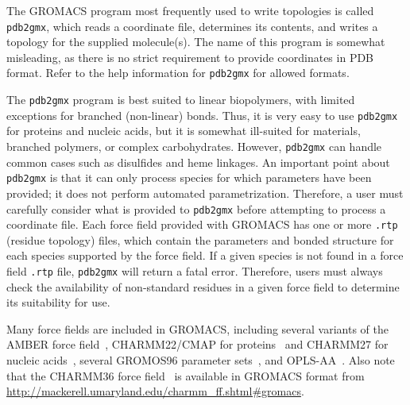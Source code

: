 \documentclass[9pt,tutorial,pubversion]{livecoms}
\begin{document}
The GROMACS program most frequently used to write topologies is called \texttt{pdb2gmx}, which reads a coordinate file, determines its contents, and writes a topology for the supplied molecule(s). The name of this program is somewhat misleading, as there is no strict requirement to provide coordinates in PDB format. Refer to the help information for \texttt{pdb2gmx} for allowed formats.

The \texttt{pdb2gmx} program is best suited to linear biopolymers, with limited exceptions for branched (non-linear) bonds. Thus, it is very easy to use \texttt{pdb2gmx} for proteins and nucleic acids, but it is somewhat ill-suited for materials, branched polymers, or complex carbohydrates. However, \texttt{pdb2gmx} can handle common cases such as disulfides and heme linkages. An important point about \texttt{pdb2gmx} is that it can only process species for which parameters have been provided; it does not perform automated parametrization. Therefore, a user must carefully consider what is provided to \texttt{pdb2gmx} before attempting to process a coordinate file. Each force field provided with GROMACS has one or more \texttt{.rtp} (residue topology) files, which contain the parameters and bonded structure for each species supported by the force field. If a given species is not found in a force field \texttt{.rtp} file, \texttt{pdb2gmx} will return a fatal error. Therefore, users must always check the availability of non-standard residues in a given force field to determine its suitability for use.

Many force fields are included in GROMACS, including several variants of the AMBER force field~\cite{Cornell1994,Kollman1996,Wang2000,Garcia2002,Duan2003,Hornak2006,LindorffLarsen2010}, CHARMM22/CMAP for proteins~\cite{MacKerell1998,MacKerell2004} and CHARMM27 for nucleic acids~\cite{Foloppe2000,MacKerell2000}, several GROMOS96 parameter sets~\cite{Daura1998,Schuler2001,Oostenbrink2004,Schmid2011}, and OPLS-AA~\cite{Kaminski2001}. Also note that the CHARMM36 force field~\cite{Best2012,Hart2012,Denning2011,Klauda2010,Huang2016} is available in GROMACS format from \url{http://mackerell.umaryland.edu/charmm_ff.shtml#gromacs}.
\end{document}
